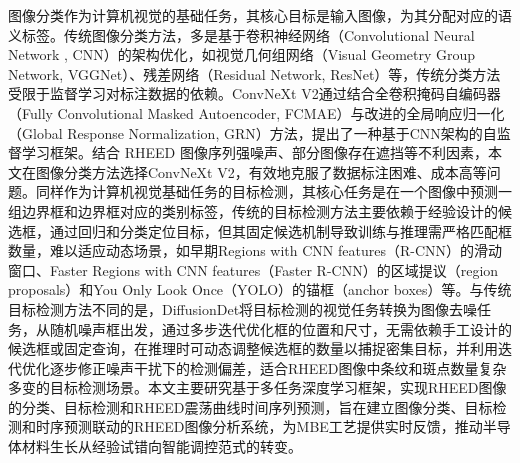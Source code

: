 图像分类作为计算机视觉的基础任务，其核心目标是输入图像，为其分配对应的语义标签。传统图像分类方法，多是基于卷积神经网络（Convolutional Neural Network , CNN）的架构优化，如视觉几何组网络（Visual Geometry Group Network, VGGNet）、残差网络（Residual Network, ResNet）等，传统分类方法受限于监督学习对标注数据的依赖。ConvNeXt V2通过结合全卷积掩码自编码器（Fully Convolutional Masked Autoencoder, FCMAE）与改进的全局响应归一化（Global Response Normalization, GRN）方法，提出了一种基于CNN架构的自监督学习框架。结合 RHEED 图像序列强噪声、部分图像存在遮挡等不利因素，本文在图像分类方法选择ConvNeXt V2，有效地克服了数据标注困难、成本高等问题。同样作为计算机视觉基础任务的目标检测，其核心任务是在一个图像中预测一组边界框和边界框对应的类别标签，传统的目标检测方法主要依赖于经验设计的候选框，通过回归和分类定位目标，但其固定候选机制导致训练与推理需严格匹配框数量，难以适应动态场景，如早期Regions with CNN features（R-CNN）的滑动窗口、Faster Regions with CNN features（Faster R-CNN）的区域提议（region proposals）和You Only Look Once（YOLO）的锚框（anchor boxes）等。与传统目标检测方法不同的是，DiffusionDet将目标检测的视觉任务转换为图像去噪任务，从随机噪声框出发，通过多步迭代优化框的位置和尺寸，无需依赖手工设计的候选框或固定查询，在推理时可动态调整候选框的数量以捕捉密集目标，并利用迭代优化逐步修正噪声干扰下的检测偏差，适合RHEED图像中条纹和斑点数量复杂多变的目标检测场景。本文主要研究基于多任务深度学习框架，实现RHEED图像的分类、目标检测和RHEED震荡曲线时间序列预测，旨在建立图像分类、目标检测和时序预测联动的RHEED图像分析系统，为MBE工艺提供实时反馈，推动半导体材料生长从经验试错向智能调控范式的转变。







% 

